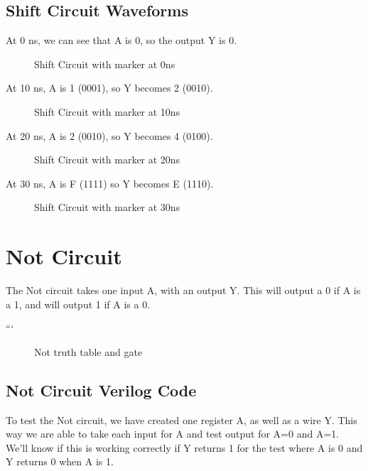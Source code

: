 \documentclass[12pt]{article}
\begin{document}
\subsection{Shift Circuit Waveforms}

At 0 ns, we can see that A is 0, so the output Y is 0.
\begin{figure}[H]
    \centering
    \caption{Shift Circuit with marker at 0ns}
    \label{fig:shift-wave1}
\end{figure}

At 10 ns, A is 1 (0001), so Y becomes 2 (0010).
\begin{figure}[H]
    \centering
    \caption{Shift Circuit with marker at 10ns}
    \label{fig:shift-wave2}
\end{figure}

At 20 ns, A is 2 (0010), so Y becomes 4 (0100).
\begin{figure}[H]
    \centering
    \caption{Shift Circuit with marker at 20ns}
    \label{fig:shift-wave3}
\end{figure}


At 30 ns, A is F (1111) so Y becomes E (1110).
\begin{figure}[H]
    \centering
    \caption{Shift Circuit with marker at 30ns}
    \label{fig:shift-wave4}
\end{figure}

\section{Not Circuit}
The Not circuit takes one input A, with an output Y. This will output a 0 if A is a 1, and will output 1 if A is a 0.

```\begin{figure}[H]
    \centering
    \caption{Not truth table and gate}
    \label{fig:shift-table}
\end{figure}

\subsection{Not Circuit Verilog Code}


To test the Not circuit, we have created one register A, as well as a wire Y. This way we are able to take each input for A and test output for A=0 and A=1. We'll know if this is working correctly if Y returns 1 for the test where A is 0 and Y returns 0 when A is 1.

\end{document}
